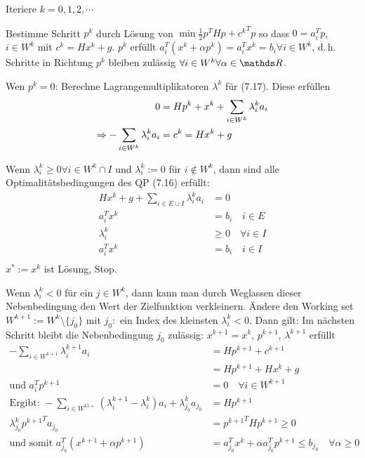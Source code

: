 Iteriere $k=0,1,2,\cdots$
\item Bestimme Schritt $p^k$ durch Lösung von  $\min \frac 12 p^T H p + {c^k}^T p$ so dass $0 = a_i^T p$, $i \in W^k$ mit $c^k = H x^k + g$. $p^k$ erfüllt $a_i^T (x^k + \alpha p^k) = a_i^T x^k = b_i \forall i \in W^k$, d.\,h. Schritte in Richtung $p^k$ bleiben zulässig $\forall i \in W^k \forall \alpha \in \R$.
\item Wen $p^k = 0$: Berechne Lagrangemultiplikatoren $\lambda^k$ für (7.17). Diese erfüllen
\begin{align*}
0 &= H p^k + x^k + \sum\limits_{i\in W^k} \lambda_i^k a_i \\
\Rightarrow - \sum\limits_{i\in W^k} \lambda_i^k a_i &= c^k = H x^k + g \\
\end{align*}
\item  Wenn $\lambda_i^k \geq 0 \forall i\in W^k \cap I$ und $\lambda_i^k := 0$ für $i \notin W^k$, dann sind alle Optimalitätsbedingungen des QP (7.16) erfüllt:
\begin{align*}
H x^k + g + \sum\limits_{i \in E \cup I} \lambda_i^k a_i &= 0 \\
a_i^Tx^k &= b_i \quad i \in E \\
\lambda_i^k & \geq 0 \quad \forall i \in I \\
a_i^T x^k &= b_i \quad i \in I \\
\end{align*}
$x^* := x^k$ ist Lösung, Stop.
\item Wenn $\lambda_i^k < 0$ für ein $j \in W^k$, dann kann man durch Weglassen dieser Nebenbedingung den Wert der Zielfunktion verkleinern. Ändere den Working set $W^{k+1} := W^k \setminus \{j_0 \}$ mit $j_0\colon$ ein Index des kleinsten $\lambda_i^k < 0$. Dann gilt: Im nächsten Schritt bleibt die Nebenbedingung $j_0$ zulässig: $x^{k+1} = x^k$, $p^{k+1}$, $\lambda^{k+1}$ erfüllt
\begin{align*}
-\sum\limits_{i\in W^{k+1}} \lambda_i^{k+1} a_i &= H p^{k+1} + c^{k+1} \\
&= H p^{k+1} + H x^k + g \\
\text{und } a_i^T p^{k+1} &= 0 \quad \forall i \in W^{k+1} \\
\text{Ergibt: } -\sum\limits_{i\in W^{k1+}} (\lambda_i^{k+1} - \lambda_i^k) a_i + \lambda_{j_0}^k a_{j_0} &= H p^{k+1} \\
\lambda_{j_0}^k {p^{k+1}}^T a_{j_0} &= {p^{k+1}}^T H p^{k+1} \geq 0 \\
\text{und somit } a_{j_0}^T (x^{k+1} + \alpha p^{k+1}) &= a_{j_0}^T x^k + \alpha a_{j_0}^T p^{k+1} \leq b_{j_0} \quad \forall \alpha \geq 0 \\
\end{align*}

